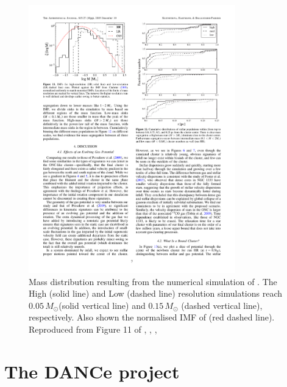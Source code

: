 \begin{figure}[ht!]
\begin{center}
\includegraphics[width=0.8\textwidth]{background/Figures/F11_Kuznetsova2015.pdf}
\caption{Mass distribution resulting from the numerical simulation of \citet{2015ApJ...815...27K}. The High (solid line) and Low (dashed line) resolution simulations reach $0.05\, M_{\odot}$(solid vertical line) and $0.15\, M_{\odot}$ (dashed vertical line), respectively. Also shown the normalised IMF of \citet{Chabrier2005} (red dashed line). Reproduced from Figure 11 of \citet{2015ApJ...815...27K}, \textit{}, , }
\label{fig:IMFKuznetsova}
\end{center}
\end{figure}

\section{The DANCe project}
\label{sect:DANCeproject}

